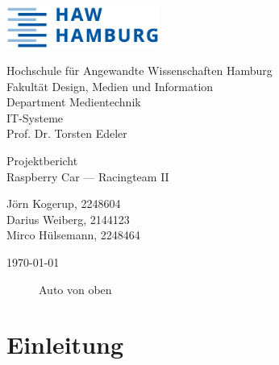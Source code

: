\documentclass[a4paper, 12pt]{scrartcl}
\begin{document}
\thispagestyle{empty}

\begin{flushright}
	\includegraphics[width=5cm]{HAW_Logo.eps}
\end{flushright}

Hochschule für Angewandte Wissenschaften Hamburg\\
Fakultät Design, Medien und Information\\
Department Medientechnik\\[1ex]
IT-Systeme\\
Prof. Dr. Torsten Edeler

\vspace{1cm}

\begin{center}
	\large{Projektbericht}\\
	\LARGE{Raspberry Car --- Racingteam II}	
	\vspace{2ex}
	
	\large{
		Jörn Kogerup, 2248604\\
		Darius Weiberg, 2144123\\
		Mirco Hülsemann, 2248464
	}
	\vspace{2ex}
	
	\large{\today}
\end{center}

\vspace{1cm}

\begin{figure}[H] 
	\centering
	\caption{Auto von oben}
\end{figure}

\newpage

\tableofcontents

\newpage

\section{Einleitung}
\end{document}
